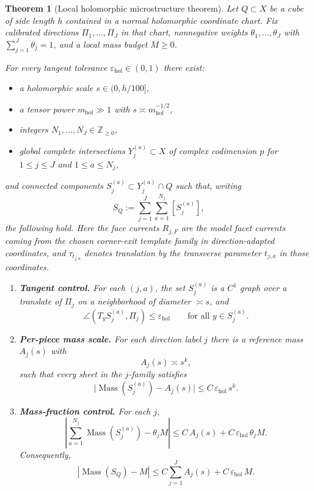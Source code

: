 \documentclass[11pt]{article}
\numberwithin{equation}{section}
\theoremstyle{plain}
\newtheorem{theorem}{Theorem}[section]
\theoremstyle{definition}
\theoremstyle{remark}
\DeclareMathOperator{\Mass}{Mass}
\newcommand{\Z}{\mathbb{Z}}
\newcommand{\eps}{\varepsilon}
\newcommand{\mhol}{m_{\mathrm{hol}}}
\begin{document}
\begin{theorem}[Local holomorphic microstructure theorem]\label{thm:main}
Let $Q \subset X$ be a cube of side length $h$ contained in a normal holomorphic coordinate chart.  Fix calibrated directions $\Pi_1,\dots,\Pi_J$ in that chart, nonnegative weights $\theta_1,\dots,\theta_J$ with $\sum_{j=1}^J \theta_j = 1$, and a local mass budget $M \ge 0$.

For every tangent tolerance $\eps_{\mathrm{hol}} \in (0,1)$ there exist:
\begin{itemize}
\item a holomorphic scale $s \in (0,h/100]$,
\item a tensor power $\mhol \gg 1$ with $s \asymp \mhol^{-1/2}$,
\item integers $N_1,\dots,N_J \in \Z_{\ge 0}$,
\item global complete intersections $Y_j^{(a)} \subset X$ of complex codimension $p$ for $1 \le j \le J$ and $1 \le a \le N_j$,
\end{itemize}
and connected components $S_j^{(a)} \subset Y_j^{(a)} \cap Q$ such that, writing
\[
S_Q := \sum_{j=1}^J \sum_{a=1}^{N_j} [S_j^{(a)}],
\]
the following hold.  Here the face currents $R_{j,F}$ are the model facet currents
coming from the chosen corner-exit template family in direction-adapted coordinates,
and $\tau_{t_{j,a}}$ denotes translation by the transverse parameter $t_{j,a}$ in those
coordinates.

\begin{enumerate}
\item[\textnormal{(i)}] \textbf{Tangent control.}  
For each $(j,a)$, the set $S_j^{(a)}$ is a $C^1$ graph over a translate of $\Pi_j$ on a neighborhood of diameter $\asymp s$, and
\[
\angle(T_y S_j^{(a)},\Pi_j) \le \eps_{\mathrm{hol}}
\qquad
\text{for all } y \in S_j^{(a)}.
\]

\item[\textnormal{(ii)}] \textbf{Per-piece mass scale.}
For each direction label $j$ there is a reference mass $A_j(s)$ with
\[
A_j(s) \asymp s^k,
\]
such that every sheet in the $j$-family satisfies
\[
\bigl|\Mass(S_j^{(a)}) - A_j(s)\bigr|
\le C\,\eps_{\mathrm{hol}}\,s^k.
\]

\item[\textnormal{(iii)}] \textbf{Mass-fraction control.}
For each $j$,
\[
\left|
\sum_{a=1}^{N_j} \Mass(S_j^{(a)}) - \theta_j M
\right|
\le C\,A_j(s) + C\,\eps_{\mathrm{hol}}\,\theta_j M.
\]
Consequently,
\[
\left|
\Mass(S_Q) - M
\right|
\le C \sum_{j=1}^J A_j(s) + C\,\eps_{\mathrm{hol}}\,M.
\]


\end{enumerate}
\end{theorem}
\end{document}
